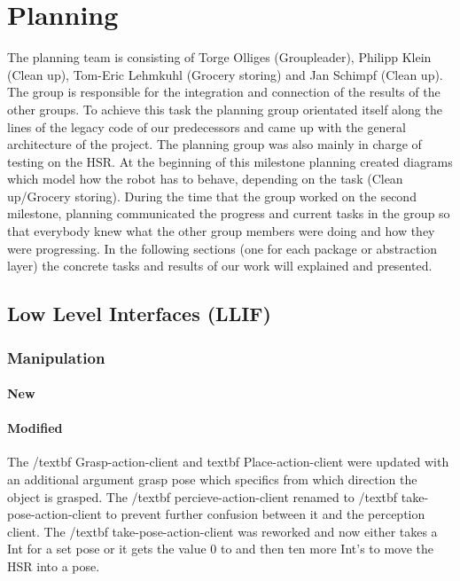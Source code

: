 \documentclass[main.tex]{subfiles}
\begin{document}
	
	\chapter{Planning}
		
                The planning team is consisting of Torge Olliges (Groupleader), Philipp Klein (Clean up), Tom-Eric Lehmkuhl (Grocery storing) and Jan Schimpf (Clean up). The group is responsible for the integration and connection of the results of the other groups. To achieve this task the planning group orientated itself along the lines of the legacy code of our predecessors and came up with the general architecture of the project. The planning group was also mainly in charge of testing on the HSR. At the beginning of this milestone planning created diagrams which model how the robot has to behave, depending on the task (Clean up/Grocery storing). During the time that the group worked on the second milestone, planning communicated the progress and current tasks in the group so that everybody knew what the other group members were doing and how they were progressing. In the following sections (one for each package or abstraction layer) the concrete tasks and results of our work will explained and presented.
		
                \section{Low Level Interfaces (LLIF)}
                \subsection{Manipulation}
                \subsubsection{New}
                \subsubsection{Modified}
The /textbf {Grasp-action-client} and textbf {Place-action-client} were updated with an additional argument  grasp pose which specifics from which direction the object is grasped.
The /textbf {percieve-action-client} renamed to /textbf {take-pose-action-client} to prevent further confusion between it and the perception client.
The /textbf {take-pose-action-client} was reworked and now either takes a Int for a set pose or it gets the value 0 to and then ten more Int's to move the HSR into a pose.
\end{document}
